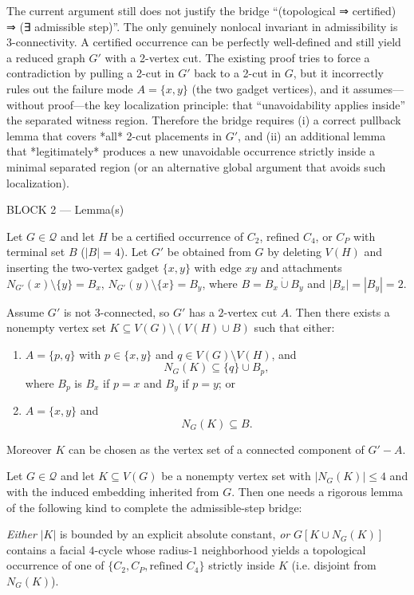 The current argument still does not justify the bridge “(topological ⇒ certified) ⇒ (∃ admissible step)”. The only genuinely nonlocal invariant in admissibility is 3-connectivity. A certified occurrence can be perfectly well-defined and still yield a reduced graph $G'$ with a 2-vertex cut. The existing proof tries to force a contradiction by pulling a 2-cut in $G'$ back to a 2-cut in $G$, but it incorrectly rules out the failure mode $A=\{x,y\}$ (the two gadget vertices), and it assumes—without proof—the key localization principle: that “unavoidability applies inside” the separated witness region. Therefore the bridge requires (i) a correct pullback lemma that covers *all* 2-cut placements in $G'$, and (ii) an additional lemma that *legitimately* produces a new unavoidable occurrence strictly inside a minimal separated region (or an alternative global argument that avoids such localization).

BLOCK 2 — Lemma(s)

\begin{lemma}\label{lem:pullback_fixed}
Let $G\in\mathcal Q$ and let $H$ be a certified occurrence of $C_2$, refined $C_4$, or $C_P$ with terminal set $B$ ($|B|=4$).
Let $G'$ be obtained from $G$ by deleting $V(H)$ and inserting the two-vertex gadget $\{x,y\}$ with edge $xy$ and attachments
$N_{G'}(x)\setminus\{y\}=B_x$, $N_{G'}(y)\setminus\{x\}=B_y$, where $B=B_x\dot\cup B_y$ and $|B_x|=|B_y|=2$.

Assume $G'$ is not $3$-connected, so $G'$ has a $2$-vertex cut $A$.
Then there exists a nonempty vertex set $K\subseteq V(G)\setminus (V(H)\cup B)$ such that either:

\begin{enumerate}
\item[\textup{(3-boundary)}] $A=\{p,q\}$ with $p\in\{x,y\}$ and $q\in V(G)\setminus V(H)$, and
\[
N_G(K)\subseteq \{q\}\cup B_p,
\]
where $B_p$ is $B_x$ if $p=x$ and $B_y$ if $p=y$; or
\item[\textup{(4-boundary)}] $A=\{x,y\}$ and
\[
N_G(K)\subseteq B.
\]
\end{enumerate}

Moreover $K$ can be chosen as the vertex set of a connected component of $G'-A$.
\end{lemma}

\begin{lemma}\label{lem:localize_unavoidability_needed}
Let $G\in\mathcal Q$ and let $K\subseteq V(G)$ be a nonempty vertex set with $|N_G(K)|\le 4$ and with the induced embedding inherited from $G$.
Then one needs a rigorous lemma of the following kind to complete the admissible-step bridge:

\emph{Either} $|K|$ is bounded by an explicit absolute constant,
\emph{or} $G[K\cup N_G(K)]$ contains a facial $4$-cycle whose radius-$1$ neighborhood yields a topological occurrence of one of
$\{C_2,C_P,\text{refined }C_4\}$ strictly inside $K$ (i.e. disjoint from $N_G(K)$).
\end{lemma}

